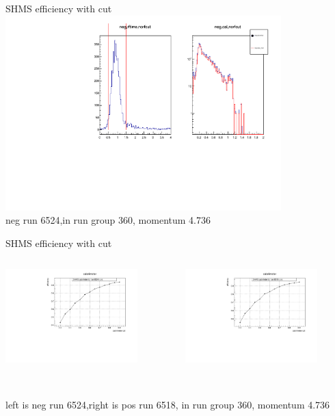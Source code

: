\documentclass[aspectratio=169,xcolor=dvipsnames]{beamer}
\begin{document}
\begin{frame}{SHMS efficiency with cut}
  \includegraphics[width = 0.8\textwidth]{results/pid/SHMS_cal_DE_6524.pdf}
  \\
  neg run 6524,in run group 360, momentum 4.736
\end{frame}
\begin{frame}{SHMS efficiency with cut}
  \begin{columns}
    \begin{column}[T]{0.5\textwidth}
  \includegraphics[width = 0.8\textwidth]{results/pid/SHMS_cal_6524.pdf}
\end{column}
\begin{column}[T]{0.5\textwidth}
  \includegraphics[width = 0.8\textwidth]{results/pid/SHMS_cal_6518.pdf}
\end{column}
\end{columns}
  \\
  left is neg run 6524,right is pos run 6518, in run group 360, momentum 4.736
 
\end{frame}
\end{document}
